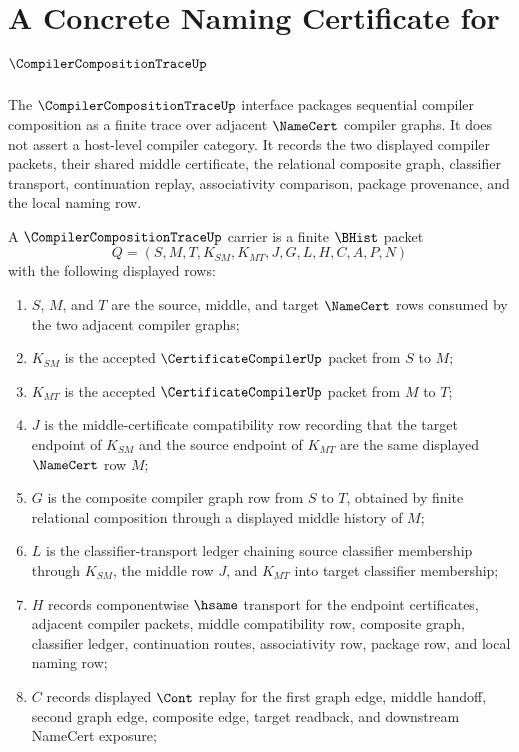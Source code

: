 \chapter{A Concrete Naming Certificate for $\CompilerCompositionTraceUp$}
\label{ch:concrete-instances-compilercompositiontrace-namecert}

The $\CompilerCompositionTraceUp$ interface packages sequential compiler composition as a finite trace over adjacent $\NameCert$ compiler graphs. It does not assert a host-level compiler category. It records the two displayed compiler packets, their shared middle certificate, the relational composite graph, classifier transport, continuation replay, associativity comparison, package provenance, and the local naming row.

\begin{definition}
\label{def:compiler-composition-trace-carrier}
A $\CompilerCompositionTraceUp$ carrier is a finite $\BHist$ packet
$$
Q=(S,M,T,K_{SM},K_{MT},J,G,L,H,C,A,P,N)
$$
with the following displayed rows:
\begin{enumerate}
\item $S$, $M$, and $T$ are the source, middle, and target $\NameCert$ rows consumed by the two adjacent compiler graphs;
\item $K_{SM}$ is the accepted $\CertificateCompilerUp$ packet from $S$ to $M$;
\item $K_{MT}$ is the accepted $\CertificateCompilerUp$ packet from $M$ to $T$;
\item $J$ is the middle-certificate compatibility row recording that the target endpoint of $K_{SM}$ and the source endpoint of $K_{MT}$ are the same displayed $\NameCert$ row $M$;
\item $G$ is the composite compiler graph row from $S$ to $T$, obtained by finite relational composition through a displayed middle history of $M$;
\item $L$ is the classifier-transport ledger chaining source classifier membership through $K_{SM}$, the middle row $J$, and $K_{MT}$ into target classifier membership;
\item $H$ records componentwise $\hsame$ transport for the endpoint certificates, adjacent compiler packets, middle compatibility row, composite graph, classifier ledger, continuation routes, associativity row, package row, and local naming row;
\item $C$ records displayed $\Cont$ replay for the first graph edge, middle handoff, second graph edge, composite edge, target readback, and downstream NameCert exposure;

\end{enumerate}
\end{definition}
